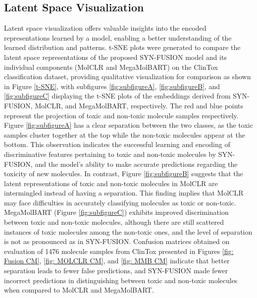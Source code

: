\documentclass[sigconf,nonacm]{acmart}
\begin{document}
\subsection{Latent Space Visualization}



Latent space visualization offers valuable insights into the encoded representations learned by a model, enabling a better understanding of the learned distribution and patterns. t-SNE \cite{JMLR:v9:vandermaaten08a} plots were generated to compare the latent space representations of the proposed SYN-FUSION model and its individual components (MolCLR and MegaMolBART) on the ClinTox classification dataset, providing qualitative visualization for comparison as shown in Figure \ref{t-SNE}, with subfigures \ref{fig:subfigureA}, \ref{fig:subfigureB}, and \ref{fig:subfigureC} displaying the t-SNE plots of the embeddings derived from SYN-FUSION, MolCLR, and MegaMolBART, respectively. The red and blue points represent the projection of toxic and non-toxic molecule samples respectively. Figure \ref{fig:subfigureA} has a clear separation between the two classes, as the toxic samples cluster together at the top while the non-toxic molecules appear at the bottom. This observation indicates the successful learning and encoding of discriminative features pertaining to toxic and non-toxic molecules by SYN-FUSION, and the model's ability to make accurate predictions regarding the toxicity of new molecules.
In contrast, Figure \ref{fig:subfigureB} suggests that the latent representations of toxic and non-toxic molecules in MolCLR are intermingled instead of having a separation.
This finding implies that MolCLR may face difficulties in accurately classifying molecules as toxic or non-toxic. MegaMolBART (Figure \ref{fig:subfigureC}) exhibits improved discrimination between toxic and non-toxic molecules, although there are still scattered instances of toxic molecules among the non-toxic ones, and the level of separation is not as pronounced as in SYN-FUSION. Confusion matrices obtained on evaluation of 1476 molecule samples from ClinTox presented in Figures \ref{fig: Fusion CM}, \ref{fig: MOLCLR CM}, and \ref{fig: MMB CM} indicate that better separation leads to fewer false predictions, and SYN-FUSION made fewer incorrect predictions in distinguishing between toxic and non-toxic molecules when compared to MolCLR and MegaMolBART.
\end{document}
